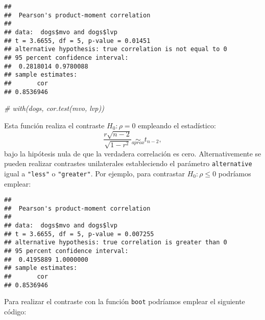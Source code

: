 \documentclass[]{book}
\newenvironment{Shaded}{\begin{snugshade}}{\end{snugshade}}
\newcommand{\KeywordTok}[1]{\textcolor[rgb]{0.13,0.29,0.53}{\textbf{#1}}}
\newcommand{\DataTypeTok}[1]{\textcolor[rgb]{0.13,0.29,0.53}{#1}}
\newcommand{\DecValTok}[1]{\textcolor[rgb]{0.00,0.00,0.81}{#1}}
\newcommand{\StringTok}[1]{\textcolor[rgb]{0.31,0.60,0.02}{#1}}
\newcommand{\CommentTok}[1]{\textcolor[rgb]{0.56,0.35,0.01}{\textit{#1}}}
\newcommand{\ControlFlowTok}[1]{\textcolor[rgb]{0.13,0.29,0.53}{\textbf{#1}}}
\newcommand{\OperatorTok}[1]{\textcolor[rgb]{0.81,0.36,0.00}{\textbf{#1}}}
\newcommand{\NormalTok}[1]{#1}
\theoremstyle{break}
\theoremstyle{definition}
\theoremstyle{definition}
\theoremstyle{definition}
\theoremstyle{remark}
\begin{document}
\begin{verbatim}
## 
##  Pearson's product-moment correlation
## 
## data:  dogs$mvo and dogs$lvp
## t = 3.6655, df = 5, p-value = 0.01451
## alternative hypothesis: true correlation is not equal to 0
## 95 percent confidence interval:
##  0.2818014 0.9780088
## sample estimates:
##       cor 
## 0.8536946
\end{verbatim}

\begin{Shaded}
\begin{Highlighting}[]
\CommentTok{# with(dogs, cor.test(mvo, lvp))}
\end{Highlighting}
\end{Shaded}

Esta función realiza el contraste \(H_0: \rho = 0\) empleando el
estadístico:
\[\frac{r\sqrt{n - 2}}{\sqrt{1 - r^2}} \underset{aprox}{\sim } t_{n-2},\]
bajo la hipótesis nula de que la verdadera correlación es cero.
Alternativemente se pueden realizar contrastes unilaterales
estableciendo el parámetro \texttt{alternative} igual a \texttt{"less"}
o \texttt{"greater"}. Por ejemplo, para contrastar \(H_0: \rho \leq 0\)
podríamos emplear:

\begin{Shaded}
\end{Shaded}

\begin{verbatim}
## 
##  Pearson's product-moment correlation
## 
## data:  dogs$mvo and dogs$lvp
## t = 3.6655, df = 5, p-value = 0.007255
## alternative hypothesis: true correlation is greater than 0
## 95 percent confidence interval:
##  0.4195889 1.0000000
## sample estimates:
##       cor 
## 0.8536946
\end{verbatim}

Para realizar el contraste con la función \texttt{boot} podríamos
emplear el siguiente código:

\begin{Shaded}
\end{Shaded}
\end{document}
